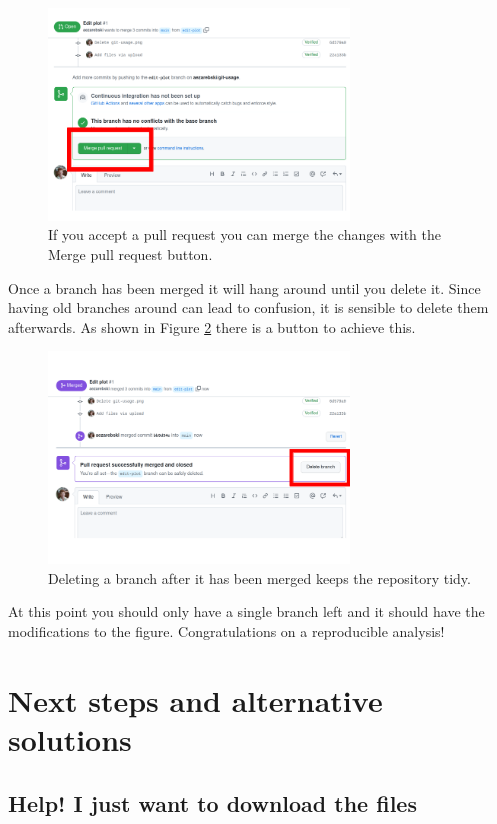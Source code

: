 \documentclass[11pt,onecolumn]{scrartcl}
\begin{document}
\begin{figure}[htbp]
\centering
\includegraphics[width=8cm]{./merge-pull-request.png}
\caption{\label{fig:merge-pull-request}If you accept a pull request you can merge the changes with the Merge pull request button.}
\end{figure}

Once a branch has been merged it will hang around until you delete it. Since
having old branches around can lead to confusion, it is sensible to delete them
afterwards. As shown in Figure \ref{fig:delete-branch} there is a button to achieve
this.

\begin{figure}[htbp]
\centering
\includegraphics[width=8cm]{./delete-branch.png}
\caption{\label{fig:delete-branch}Deleting a branch after it has been merged keeps the repository tidy.}
\end{figure}

At this point you should only have a single branch left and it should have the
modifications to the figure. Congratulations on a reproducible analysis!

\section{Next steps and alternative solutions}
\label{sec:org170d947}

\subsection{Help! I just want to download the files}
\label{sec:org70a424d}
\end{document}
